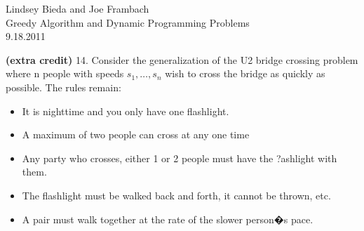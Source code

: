 \documentclass[10pt]{article}
\begin{document}
	\begin{flushright}
	Lindsey Bieda and Joe Frambach\\
	Greedy Algorithm and Dynamic Programming Problems\\
	9.18.2011
	\end{flushright}
	\noindent
	\textbf{(extra credit)} 14. Consider the generalization of the U2 bridge crossing problem where n people with speeds $s_1,\ldots, s_n$
															wish to cross the bridge as quickly as possible. The rules remain:
	
	\begin{itemize}
		\item It is nighttime and you only have one flashlight.
		\item A maximum of two people can cross at any one time
		\item Any party who crosses, either 1 or 2 people must have the ?ashlight with them.
		\item The flashlight must be walked back and forth, it cannot be thrown, etc.
		\item A pair must walk together at the rate of the slower person�s pace.
	\end{itemize}
	
\end{document}
